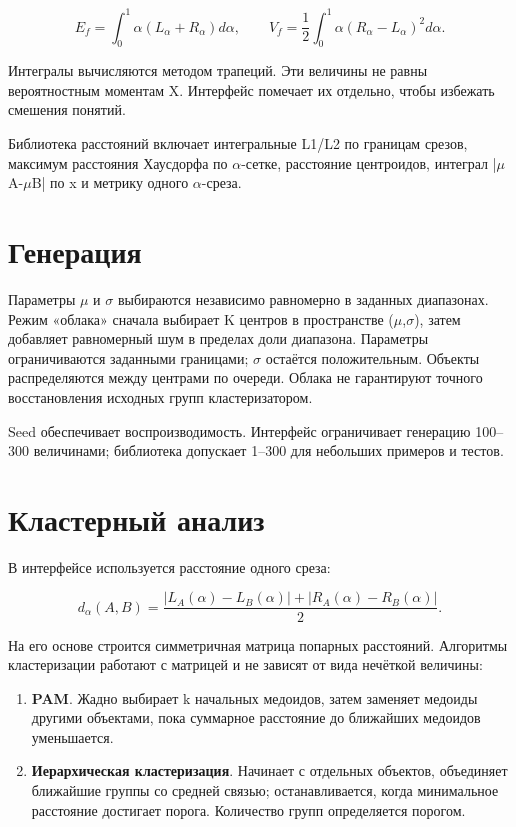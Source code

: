 \documentclass[fontsize=14pt,a4paper]{scrartcl}
\begin{document}
\[
E_f=\int_0^1\alpha(L_\alpha+R_\alpha)d\alpha,\qquad
V_f=\frac12\int_0^1\alpha(R_\alpha-L_\alpha)^2d\alpha.
\]

Интегралы вычисляются методом трапеций. Эти величины не равны вероятностным моментам X. Интерфейс помечает их отдельно, чтобы избежать смешения понятий.

Библиотека расстояний включает интегральные L1/L2 по границам срезов, максимум расстояния Хаусдорфа по \(\alpha\)-сетке, расстояние центроидов, интеграл |\(\mu\)A-\(\mu\)B| по x и метрику одного \(\alpha\)-среза.

\section{Генерация}

Параметры \(\mu\) и \(\sigma\) выбираются независимо равномерно в заданных диапазонах. Режим «облака» сначала выбирает K центров в пространстве (\(\mu\),\(\sigma\)), затем добавляет равномерный шум в пределах доли диапазона. Параметры ограничиваются заданными границами; \(\sigma\) остаётся положительным. Объекты распределяются между центрами по очереди. Облака не гарантируют точного восстановления исходных групп кластеризатором.

Seed обеспечивает воспроизводимость. Интерфейс ограничивает генерацию 100–300 величинами; библиотека допускает 1–300 для небольших примеров и тестов.

\section{Кластерный анализ}

В интерфейсе используется расстояние одного среза:

\[
d_\alpha(A,B)=\frac{|L_A(\alpha)-L_B(\alpha)|+|R_A(\alpha)-R_B(\alpha)|}{2}.
\]

На его основе строится симметричная матрица попарных расстояний. Алгоритмы кластеризации работают с матрицей и не зависят от вида нечёткой величины:

\begin{enumerate}
\item \textbf{PAM}. Жадно выбирает k начальных медоидов, затем заменяет медоиды другими объектами, пока суммарное расстояние до ближайших медоидов уменьшается.
\item \textbf{Иерархическая кластеризация}. Начинает с отдельных объектов, объединяет ближайшие группы со средней связью; останавливается, когда минимальное расстояние достигает порога. Количество групп определяется порогом.
\end{enumerate}
\end{document}
